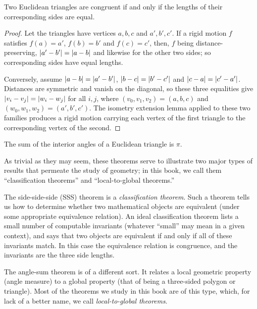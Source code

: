 \begin{theorem}
\label{thm:side-side-side}
\leanok
Two Euclidean triangles are congruent if and only if the lengths of their corresponding sides are equal.
\end{theorem}
\begin{proof}
Let the triangles have vertices $a,b,c$ and $a',b',c'$. If a rigid motion $f$ satisfies $f(a)=a'$,
$f(b)=b'$ and $f(c)=c'$, then, $f$ being distance-preserving, $\lvert a'-b' \rvert = \lvert a-b \rvert$ and likewise
for the other two sides; so corresponding sides have equal lengths.

Conversely, assume $\lvert a-b \rvert=\lvert a'-b' \rvert$, $\lvert b-c \rvert=\lvert b'-c' \rvert$ and $\lvert c-a \rvert=\lvert c'-a' \rvert$.
Distances are symmetric and vanish on the diagonal, so these three equalities give
$\lvert v_i-v_j \rvert = \lvert w_i-w_j \rvert$ for all $i,j$, where $(v_0,v_1,v_2)=(a,b,c)$ and
$(w_0,w_1,w_2)=(a',b',c')$. The isometry extension lemma applied to these two families produces a
rigid motion carrying each vertex of the first triangle to the corresponding vertex of the second.
\end{proof}

\begin{theorem}
\label{thm:angle-sum-theorem}
\mathlibok
The sum of the interior angles of a Euclidean triangle is $\pi$.
\end{theorem}

As trivial as they may seem, these theorems serve to illustrate two major types of results that permeate the study of geometry; in this book, we call them ``classification theorems'' and ``local-to-global theorems.''

The side-side-side (SSS) theorem is a \textit{classification theorem}. Such a theorem tells us how to determine whether two mathematical objects are equivalent (under some appropriate equivalence relation). An ideal classification theorem lists a small number of computable invariants (whatever ``small'' may mean in a given context), and says that two objects are equivalent if and only if all of these invariants match. In this case the equivalence relation is congruence, and the invariants are the three side lengths.

The angle-sum theorem is of a different sort. It relates a local geometric property (angle measure) to a global property (that of being a three-sided polygon or triangle). Most of the theorems we study in this book are of this type, which, for lack of a better name, we call \textit{local-to-global theorems}.

